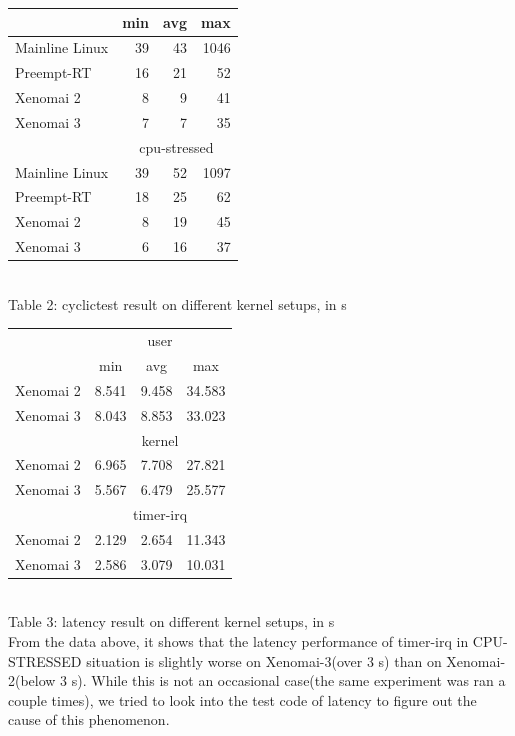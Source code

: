 \documentclass[10pt,a4paper]{article}
\begin{document}
\begin{multicols}{2}
\begin{tabular}{|l|r|r|r|}
 & \multicolumn{1}{l|}{min} & \multicolumn{1}{l|}{avg} & \multicolumn{1}{l|}{max} \\ \hline
Mainline Linux & 39 & 43 & 1046  \\ \hline
Preempt-RT & 16 & 21 & 52 \\ \hline
Xenomai 2 & 8 & 9 & 41 \\ \hline
Xenomai 3 & 7 & 7 & 35 \\ \hline
 & \multicolumn{3}{c|}{cpu-stressed} \\ \hline
Mainline Linux & 39 & 52 & 1097 \\ \hline
Preempt-RT & 18 & 25 & 62 \\ \hline
Xenomai 2 & 8 & 19 & 45 \\ \hline
Xenomai 3 & 6 & 16 & 37 \\ \hline
\end{tabular}\\
Table 2: cyclictest result on different kernel setups, in \textmu s\\
\begin{tabular}{|l|c|r|r|}
\hline
\multirow{2}{*}{} & \multicolumn{3}{c|}{user} \\ \cline{2-4} 
 & min & \multicolumn{1}{c|}{avg} & \multicolumn{1}{c|}{max} \\ \hline
Xenomai 2 & 8.541 & 9.458 & 34.583 \\ \hline
Xenomai 3 & 8.043 & 8.853 & 33.023 \\ \hline
& \multicolumn{3}{c|}{kernel}      \\ \hline
Xenomai 2 & 6.965 & 7.708 & 27.821 \\ \hline
Xenomai 3 & 5.567 & 6.479 & 25.577 \\ \hline
& \multicolumn{3}{c|}{timer-irq}   \\ \hline
Xenomai 2 & 2.129 & 2.654 & 11.343 \\ \hline
Xenomai 3 & 2.586 & 3.079 & 10.031 \\ \hline
\end{tabular} \\
Table 3: latency result on different kernel setups, in \textmu s\\

From the data above, it shows that the latency performance of timer-irq in CPU-STRESSED situation is slightly worse on Xenomai-3(over 3 \textmu s) than on Xenomai-2(below 3 \textmu s). While this is not an occasional case(the same experiment was ran a couple times), we tried to look into the test code of latency to figure out the cause of this phenomenon.


\end{multicols}
\end{document}
